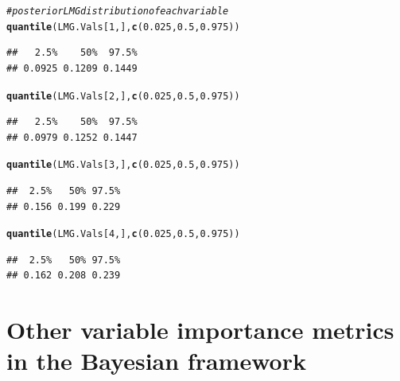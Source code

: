 \documentclass[11pt,a4paper,twoside]{book}\usepackage[]{graphicx}\usepackage[]{color}
\makeatletter
\newcommand{\hlnum}[1]{\textcolor[rgb]{0.686,0.059,0.569}{#1}}%
\newcommand{\hlcom}[1]{\textcolor[rgb]{0.678,0.584,0.686}{\textit{#1}}}%
\newcommand{\hlstd}[1]{\textcolor[rgb]{0.345,0.345,0.345}{#1}}%
\newcommand{\hlkwd}[1]{\textcolor[rgb]{0.737,0.353,0.396}{\textbf{#1}}}%
\newenvironment{kframe}{%
 \def\at@end@of@kframe{}%
 \ifinner\ifhmode%
  \def\at@end@of@kframe{\end{minipage}}%
  \begin{minipage}{\columnwidth}%
 \fi\fi%
 \def\FrameCommand##1{\hskip\@totalleftmargin \hskip-\fboxsep
 \colorbox{shadecolor}{##1}\hskip-\fboxsep
     \hskip-\linewidth \hskip-\@totalleftmargin \hskip\columnwidth}%
 \MakeFramed {\advance\hsize-\width
   \@totalleftmargin\z@ \linewidth\hsize
   \@setminipage}}%
 {\par\unskip\endMakeFramed%
 \at@end@of@kframe}
\newenvironment{knitrout}{}{} %
\makeatother
\begin{document}
\begin{knitrout}
\begin{kframe}
\begin{alltt}
\hlcom{# posterior LMG distribution of each variable}
\hlkwd{quantile}\hlstd{(LMG.Vals[}\hlnum{1}\hlstd{,],} \hlkwd{c}\hlstd{(}\hlnum{0.025}\hlstd{,} \hlnum{0.5}\hlstd{,} \hlnum{0.975}\hlstd{))}
\end{alltt}
\begin{verbatim}
##   2.5%    50%  97.5% 
## 0.0925 0.1209 0.1449
\end{verbatim}
\begin{alltt}
\hlkwd{quantile}\hlstd{(LMG.Vals[}\hlnum{2}\hlstd{,],} \hlkwd{c}\hlstd{(}\hlnum{0.025}\hlstd{,} \hlnum{0.5}\hlstd{,} \hlnum{0.975}\hlstd{))}
\end{alltt}
\begin{verbatim}
##   2.5%    50%  97.5% 
## 0.0979 0.1252 0.1447
\end{verbatim}
\begin{alltt}
\hlkwd{quantile}\hlstd{(LMG.Vals[}\hlnum{3}\hlstd{,],} \hlkwd{c}\hlstd{(}\hlnum{0.025}\hlstd{,} \hlnum{0.5}\hlstd{,} \hlnum{0.975}\hlstd{))}
\end{alltt}
\begin{verbatim}
##  2.5%   50% 97.5% 
## 0.156 0.199 0.229
\end{verbatim}
\begin{alltt}
\hlkwd{quantile}\hlstd{(LMG.Vals[}\hlnum{4}\hlstd{,],} \hlkwd{c}\hlstd{(}\hlnum{0.025}\hlstd{,} \hlnum{0.5}\hlstd{,} \hlnum{0.975}\hlstd{))}
\end{alltt}
\begin{verbatim}
##  2.5%   50% 97.5% 
## 0.162 0.208 0.239
\end{verbatim}
\end{kframe}
\end{knitrout}















\chapter{Other variable importance metrics in the Bayesian framework}
\end{document}
